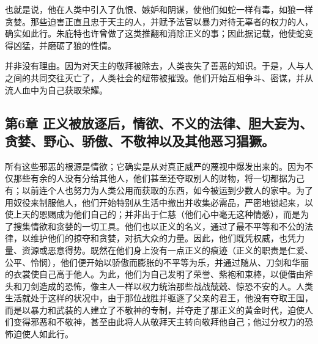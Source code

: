 也就是说，他在人类中引入了仇恨、嫉妒和阴谋，使他们如蛇一样有毒，如狼一样贪婪。那些迫害正直且忠于天主的人，并赋予法官以暴力对待无辜者的权力的人，确实如此行。朱庇特也许曾做了这类推翻和消除正义的事；因此据记载，他使蛇变得凶猛，并磨砺了狼的性情。\par

\par

并非没有理由。因为对天主的敬拜被除去，人类丧失了善恶的知识。于是，人与人之间的共同交往灭亡了，人类社会的纽带被摧毁。他们开始互相争斗、密谋，并从流人血中为自己获取荣耀。\par


\subsection{第6章 正义被放逐后，情欲、不义的法律、胆大妄为、贪婪、野心、骄傲、不敬神以及其他恶习猖獗。}

所有这些邪恶的根源是情欲；它确实是从对真正威严的蔑视中爆发出来的。因为不仅那些有余的人没有分给其他人，他们甚至还夺取别人的财物，将一切都据为己有；以前连个人也努力为人类公用而获取的东西，如今被运到少数人的家中。为了用奴役来制服他人，他们开始特别从生活中撤出并收集必需品，严密地锁起来，以使上天的恩赐成为他们自己的；并非出于仁慈（他们心中毫无这种情感），而是为了搜集情欲和贪婪的一切工具。他们也以正义的名义，通过了最不平等和不公的法律，以维护他们的掠夺和贪婪，对抗大众的力量。因此，他们既凭权威，也凭力量、资源或恶意得势。既然在他们身上没有一点正义的痕迹（正义的职责是仁爱、公平、怜悯），他们便开始以骄傲而膨胀的不平等为乐，并通过随从、刀剑和华丽的衣裳使自己高于他人。为此，他们为自己发明了荣誉、紫袍和束棒，以便借由斧头和刀剑造成的恐怖，像主人一样以权力统治那些战战兢兢、惊恐不安的人。人类生活就处于这样的状况中，由于那位战胜并驱逐了父亲的君王，他没有夺取王国，而是以暴力和武装的人建立了不敬神的专制，并夺走了那正义的黄金时代，迫使人们变得邪恶和不敬神，甚至由此将人从敬拜天主转向敬拜他自己；他过分权力的恐怖迫使人如此行。\par

